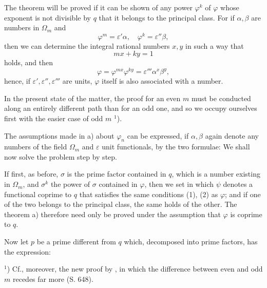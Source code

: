 
The theorem will be proved if it can be shown of any power
$\varphi^k$ of $\varphi$ whose exponent is not divisible by $q$
that it belongs to the principal class. For if $\alpha, \beta$
are numbers in $\Omega_m$ and
\[
\varphi^m = \varepsilon' \alpha, \quad \varphi^k = \varepsilon'' \beta,
\]
then we can determine the integral rational numbers $x, y$ in such
a way that
\[
mx + ky = 1
\]
holds, and then
\[
\varphi = \varphi^{mx} \varphi^{ky} = \varepsilon''' \alpha^x \beta^y,
\]
hence, if $\varepsilon', \varepsilon'', \varepsilon'''$ are units,
$\varphi$ itself is also associated with a number.

In the present state of the matter, the proof for an even $m$ must
be conducted along an entirely different path than for an odd one,
and so we occupy ourselves first with the easier case of odd
$m$ $^1$).

The assumptions made in a) about $\varphi_n$ can be expressed, if
$\alpha, \beta$ again denote any numbers of the field $\Omega_m$
and $\varepsilon$ unit functionals, by the two formulae:
We shall now solve the problem step by step.

If first, as before, $\sigma$ is the prime factor contained in
$q$, which is a number existing in $\Omega_m$, and $\sigma^k$ the
power of $\sigma$ contained in $\varphi$, then we set
in which $\psi$ denotes a functional coprime to $q$ that satisfies
the same conditions (1), (2) as $\varphi$; and if one of the two
belongs to the principal class, the same holds of the other. The
theorem a) therefore need only be proved under the assumption that
$\varphi$ is coprime to $q$.

Now let $p$ be a prime different from $q$ which, decomposed into
prime factors, has the expression:

\noindent
$^1$) Cf., moreover, the new proof by , in which
the difference between even and odd $m$ recedes far more
(S. 648).
